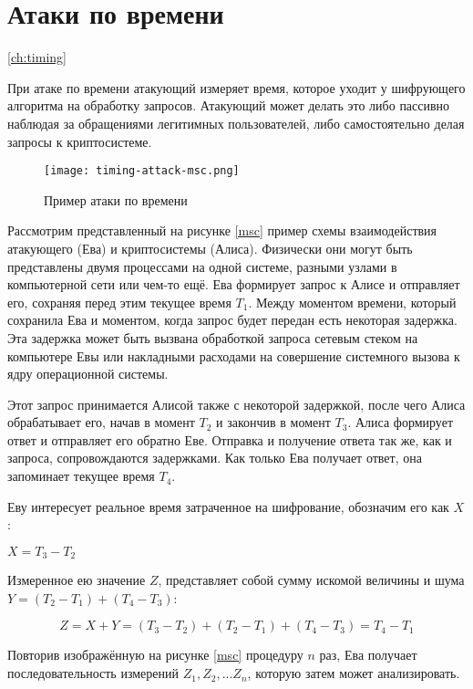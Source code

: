 \section{Атаки по времени} \ref{ch:timing}

При атаке по времени атакующий измеряет время, которое уходит у шифрующего
алгоритма на обработку запросов. Атакующий может делать это либо пассивно
наблюдая за обращениями легитимных пользователей, либо самостоятельно делая
запросы к криптосистеме.

\begin{figure}[h]
    \centering
    \texttt{[image: timing-attack-msc.png]}
    \caption{Пример атаки по времени}
\end{figure} \label{fig:msc}

Рассмотрим представленный на рисунке \ref{msc} пример схемы взаимодействия атакующего (Ева)
и криптосистемы (Алиса). Физически они могут быть представлены двумя процессами на одной
системе, разными узлами в компьютерной сети или чем-то ещё. Ева формирует запрос
к Алисе и отправляет его, сохраняя перед этим текущее время $T_1$. Между
моментом времени, который сохранила Ева и моментом, когда запрос будет передан
есть некоторая задержка. Эта задержка может быть вызвана обработкой запроса
сетевым стеком на компьютере Евы или накладными расходами на совершение системного
вызова к ядру операционной системы. 

Этот запрос принимается Алисой также с некоторой задержкой, после чего Алиса
обрабатывает его, начав в момент $T_2$ и закончив в момент $T_3$. Алиса
формирует ответ и отправляет его обратно Еве. Отправка и получение ответа так же,
как и запроса, сопровождаются задержками. Как только Ева получает ответ, она
запоминает текущее время $T_4$.

Еву интересует реальное время затраченное на шифрование, обозначим его как $X$ :

$X = T_3 - T_2$

Измеренное ею значение $Z$, представляет собой сумму искомой величины и шума
$Y = (T_2 - T_1) + (T_4 - T_3)$:

\begin{equation}
Z = X + Y = (T_3 - T_2) + (T_2 - T_1) + (T_4 - T_3) = T_4 - T_1
\end{equation} \label{eq:noise}

Повторив изображённую на рисунке \ref{msc} процедуру $n$ раз, Ева получает
последовательность измерений ${Z_1, Z_2, ... Z_n}$, которую затем может анализировать.

